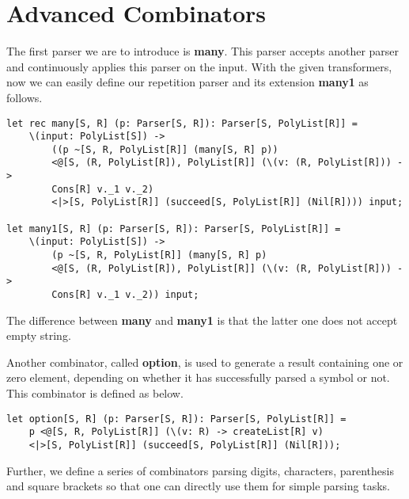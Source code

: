 \section{Advanced Combinators}
The first parser we are to introduce is \textbf{many}. This parser accepts another parser and continuously applies this parser on the input. With the given transformers, now we can easily define our repetition parser and its extension \textbf{many1} as follows.
\begin{lstlisting}
let rec many[S, R] (p: Parser[S, R]): Parser[S, PolyList[R]] =
    \(input: PolyList[S]) ->
        ((p ~[S, R, PolyList[R]] (many[S, R] p)) 
        <@[S, (R, PolyList[R]), PolyList[R]] (\(v: (R, PolyList[R])) -> 
        Cons[R] v._1 v._2)
        <|>[S, PolyList[R]] (succeed[S, PolyList[R]] (Nil[R]))) input;
        
let many1[S, R] (p: Parser[S, R]): Parser[S, PolyList[R]] =
    \(input: PolyList[S]) ->
        (p ~[S, R, PolyList[R]] (many[S, R] p)
        <@[S, (R, PolyList[R]), PolyList[R]] (\(v: (R, PolyList[R])) -> 
        Cons[R] v._1 v._2)) input;
\end{lstlisting}
The difference between \textbf{many} and \textbf{many1} is that the latter one does not accept empty string.

Another combinator, called \textbf{option}, is used to generate a result containing one or zero element, depending on whether it has successfully parsed a symbol or not. This combinator is defined as below.
\begin{lstlisting}
let option[S, R] (p: Parser[S, R]): Parser[S, PolyList[R]] =
    p <@[S, R, PolyList[R]] (\(v: R) -> createList[R] v)
    <|>[S, PolyList[R]] (succeed[S, PolyList[R]] (Nil[R]));
\end{lstlisting}
Further, we define a series of combinators parsing digits, characters, parenthesis and square brackets so that one can directly use them for simple parsing tasks.

